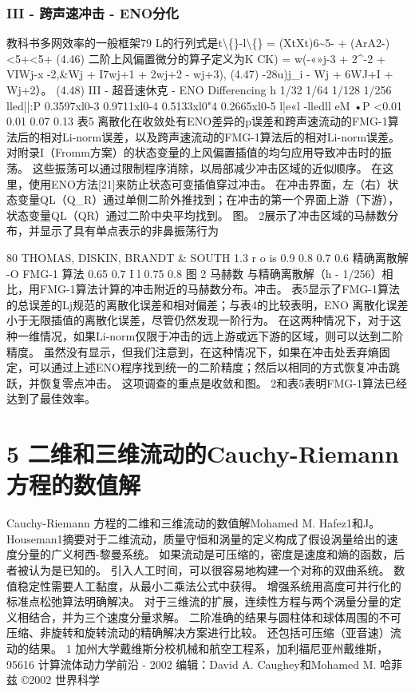 \documentclass[UTF8,11pt,a4paper,openany,fontset=fandol]{ctexbook}
\begin{document}
\subsection{III - 跨声速冲击 - ENO分化}
教科书多网效率的一般框架79 L的行列式是t\textbackslash\{\}-l\textbackslash\{\} = (XtXt)6\textasciitilde{}5- + (ArA2-)<5+<5+ (4.46) 二阶上风偏置微分的算子定义为K CK) = w(-«»j-3 + 2\textasciicircum{}-2 + VIWj-x -2,\&Wj + I7wj+1 + 2wj+2 - wj+3), (4.47) -28u)j\_i - Wj + 6WJ+I + Wj+2）。 (4.48) III - 超音速休克 - ENO Differencing h 1/32 1/64 1/128 1/256 lled||:P 0.3597xl0-3 0.9711xl0-4 0.5133xl0"4 0.2665xl0-5 l|e«l -lledll eM •P <0.01 0.01 0.07 0.13 表5 离散化在收敛处有ENO差异的p误差和跨声速流动的FMG-1算法后的相对Li-norm误差，以及跨声速流动的FMG-1算法后的相对Li-norm误差。 对附录I（Fromm方案）的状态变量的上风偏置插值的均匀应用导致冲击时的振荡。 这些振荡可以通过限制程序消除，以局部减少冲击区域的近似顺序。 在这里，使用ENO方法[21]来防止状态可变插值穿过冲击。 在冲击界面，左（右）状态变量QL（Q\_R）通过单侧二阶外推找到；在冲击的第一个界面上游（下游），状态变量QL（QR）通过二阶中央平均找到。 图。 2展示了冲击区域的马赫数分布，并显示了具有单点表示的非鼻振荡行为

80 THOMAS, DISKIN, BRANDT \& SOUTH 1.3 r o is 0.9 0.8 0.7 0.6 精确离散解 -O FMG-1 算法 0.65 0.7 I l 0.75 0.8 图 2 马赫数 与精确离散解（h - 1/256）相比，用FMG-1算法计算的冲击附近的马赫数分布。冲击。 表5显示了FMG-1算法的总误差的Lj规范的离散化误差和相对偏差；与表4的比较表明，ENO 离散化误差小于无限插值的离散化误差，尽管仍然发现一阶行为。 在这两种情况下，对于这种一维情况，如果Li-norm仅限于冲击的远上游或远下游的区域，则可以达到二阶精度。 虽然没有显示，但我们注意到，在这种情况下，如果在冲击处丢弃熵固定，可以通过上述ENO程序找到统一的二阶精度；然后以相同的方式恢复冲击跳跃，并恢复零点冲击。 这项调查的重点是收敛和图。 2和表5表明FMG-1算法已经达到了最佳效率。

\clearpage
\chapter{5 二维和三维流动的Cauchy-Riemann 方程的数值解}
Cauchy-Riemann 方程的二维和三维流动的数值解Mohamed M. Hafez1和J。 Houseman1摘要对于二维流动，质量守恒和涡量的定义构成了假设涡量给出的速度分量的广义柯西-黎曼系统。 如果流动是可压缩的，密度是速度和熵的函数，后者被认为是已知的。 引入人工时间，可以很容易地构建一个对称的双曲系统。 数值稳定性需要人工黏度，从最小二乘法公式中获得。 增强系统用高度可并行化的标准点松弛算法明确解决。 对于三维流的扩展，连续性方程与两个涡量分量的定义相结合，并为三个速度分量求解。 二阶准确的结果与圆柱体和球体周围的不可压缩、非旋转和旋转流动的精确解决方案进行比较。 还包括可压缩（亚音速）流动的结果。 1 加州大学戴维斯分校机械和航空工程系，加利福尼亚州戴维斯，95616 计算流体动力学前沿 - 2002 编辑：David A. Caughey和Mohamed M. 哈菲兹 ©2002 世界科学
\end{document}
